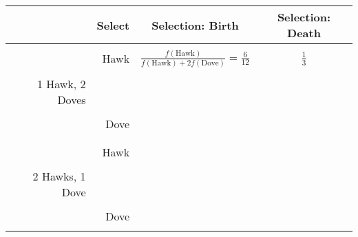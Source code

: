 \documentclass{article}
\begin{document}
\begin{center}
    \begin{tabular}{r|r|c|c}
        \toprule
        & Select       & Selection: Birth   & Selection: Death   \\
        \midrule
        &             &                                                                          & \\
        &Hawk         & \(\frac{f(\text{Hawk})}{f(\text{Hawk}) + 2f(\text{Dove})}=\frac{6}{12}\) & \(\frac{1}{3}\)\\
        &             &                                                                          & \\
1 Hawk, 2 Doves        &             &                                                                          & \\
        &             &                                                                          & \\
        &Dove         &                                                                          & \\
        &             &                                                                          & \\
        \midrule
        &             &                                                                          & \\
        &Hawk         &                                                                          & \\
        &             &                                                                          & \\
2 Hawks, 1 Dove        &             &                                                                          & \\
        &             &                                                                          & \\
        &Dove         &                                                                          & \\
        &             &                                                                          & \\
        \bottomrule
    \end{tabular}
\end{center}

\newpage
\section*{}
\end{document}

